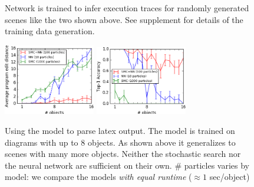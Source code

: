 \documentclass{article}
\begin{document}
\begin{figure}\centering
  \begin{minipage}{0.35\textwidth}
    \begin{minipage}[t]{2.2cm}\end{minipage}
    \begin{minipage}[t]{2.2cm}\end{minipage}
    \caption{Network is trained to infer execution traces for randomly generated scenes like the two shown above. See supplement for details of the training data generation.}\label{trainingData}
  \end{minipage}\hfill
  \begin{minipage}{0.6\textwidth}
    \includegraphics[width = 4cm]{figures/editDistance.png}
    \includegraphics[width = 4cm]{figures/accuracy.png}
      \caption{Using the model to parse latex output. The model is trained on diagrams with up to 8 objects. As shown above it generalizes to scenes with many more objects. Neither the stochastic search nor the neural network are sufficient on their own. \# particles varies by model: we compare the models \emph{with equal runtime} ($\approx 1$ sec/object)}\label{syntheticResults}
    \end{minipage}
  
  \end{figure}
\end{document}

